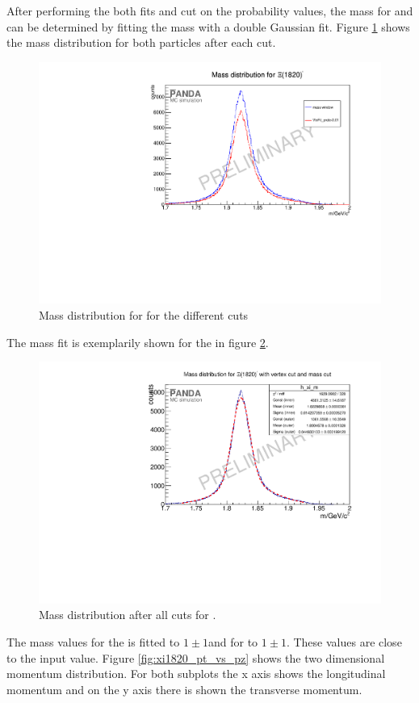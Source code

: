 	After performing the both fits and cut on the probability values, the mass for \excitedcascade and \excitedanticascade
	can be determined by fitting the mass with a double Gaussian fit. 
	Figure \ref{fig:xi1820_mass_diffcuts} shows the mass distribution for both particles after each cut.
	
	\begin{figure}
		\centering
		\includegraphics[width=1.\textwidth]{./plots/Xi1820/XiMinus1820_m_diffcuts.pdf}
		\caption{Mass distribution for \excitedcascade for the different cuts}
		\label{fig:xi1820_mass_diffcuts}
	
	\end{figure}
	The mass fit is exemplarily shown for the \excitedcascade in figure \ref{fig:xi1820_massfit}. 
	
	\begin{figure}
		\centering
		\includegraphics[width=1.\textwidth]{./plots/Xi1820/XiMinus1820_m_masscut.pdf}
		\caption{Mass distribution after all cuts for \excitedcascade.}
		\label{fig:xi1820_massfit}
	\end{figure}
	The mass values for the \excitedcascade is fitted to $1 \pm 1$\massunit and for \excitedanticascade to $1 \pm 1 $\massunit.
	These values are close to the input value.
	Figure \ref{fig:xi1820_pt_vs_pz} shows the two dimensional momentum distribution. For both subplots the x axis shows the longitudinal momentum
	and on the y axis there is shown the transverse momentum.
	

